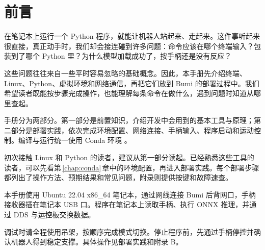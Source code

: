 \chapter*{前言}

在笔记本上运行一个 Python 程序，就能让机器人站起来、走起来。这件事听起来很直接，真正动手时，我们却会接连碰到许多问题：命令应该在哪个终端输入？包装到了哪个 Python 里？为什么模型加载成功了，按手柄还是没有反应？

这些问题往往来自一些平时容易忽略的基础概念。因此，本手册先介绍终端、Linux、Python、虚拟环境和网络通信，再把它们放到 Bumi 的部署过程中。我们希望读者既能按步骤完成操作，也能理解每条命令在做什么，遇到问题时知道从哪里查起。

手册分为两部分。第一部分是前置知识，介绍开发中会用到的基本工具与原理；第二部分是部署实践，依次完成环境配置、网络连接、手柄输入、程序启动和运动控制。编译与运行统一使用 Conda 环境 。

初次接触 Linux 和 Python 的读者，建议从第一部分读起。已经熟悉这些工具的读者，可以先看第\,\ref{chap:conda}\,章中的环境配置，再进入部署实践。每个部署步骤都列出了操作方法、预期结果和常见问题，附录则提供按键和故障速查。

本手册使用 Ubuntu 22.04 x86\_64 笔记本，通过网线连接 Bumi 后背网口，手柄接收器插在笔记本 USB 口。程序在笔记本上读取手柄、执行 ONNX 推理，并通过 DDS 与运控板交换数据。

调试时请全程使用吊架，按顺序完成模式切换。停止程序前，先通过手柄停控并确认机器人得到稳定支撑。具体操作见部署实践和附录 B。

